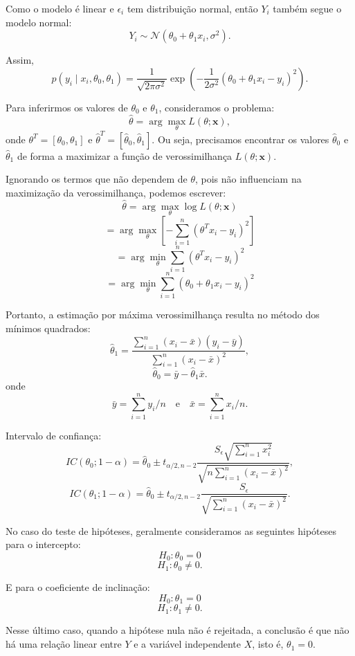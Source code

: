 \documentclass{article}
\begin{document}
Como o modelo é linear e $\epsilon_i$ tem distribuição normal, então $Y_i$ também segue o modelo normal:
    $$
    Y_i \sim \mathcal{N}(\theta_0 + \theta_1 x_i, \sigma^2).
    $$

Assim,
    $$
    p(y_i \mid x_i, \theta_0, \theta_1) = \frac{1}{\sqrt{2 \pi \sigma^2}} 
    \exp\left(-\frac{1}{2\sigma^2}(\theta_0 + \theta_1 x_i - y_i)^2\right).
    $$

Para inferirmos os valores de $\theta_0$ e $\theta_1$, consideramos o problema:
    $$
    \hat{\theta} = \arg\max_\theta L(\theta; \mathbf{x}),
    $$
onde $\theta^T = [\theta_0, \theta_1]$ e $\hat{\theta}^T = [\hat{\theta}_0, \hat{\theta}_1]$. Ou seja, precisamos encontrar os valores $\hat{\theta}_0$ e $\hat{\theta}_1$ de forma a maximizar a função de verossimilhança $L(\theta; \mathbf{x})$.

Ignorando os termos que não dependem de $\theta$, pois não influenciam na maximização da verossimilhança, podemos escrever:
    $$
    \hat{\theta} = \arg\max_\theta \log L(\theta; \mathbf{x})
    $$
    $$
    = \arg\max_\theta \left[-\sum_{i=1}^n (\theta^T x_i - y_i)^2 \right]
    $$
    $$
    = \arg\min_\theta \sum_{i=1}^n (\theta^T x_i - y_i)^2
    $$
    $$
    = \arg\min_\theta \sum_{i=1}^n (\theta_0 + \theta_1 x_i - y_i)^2
    $$

Portanto, a estimação por máxima verossimilhança resulta no método dos mínimos quadrados:
    $$
    \hat{\theta}_1 = \frac{\sum_{i=1}^n (x_i - \bar{x})(y_i - \bar{y})}{\sum_{i=1}^n (x_i - \bar{x})^2},
    $$
    $$
    \hat{\theta}_0 = \bar{y} - \hat{\theta}_1 \bar{x}.
    $$
onde 
    $$
    \bar{y} = \sum_{i=1}^n y_i / n 
    \quad \text{e} \quad 
    \bar{x} = \sum_{i=1}^n x_i / n.
    $$

Intervalo de confiança:
    $$
    IC(\theta_0; 1 - \alpha) = \hat{\theta}_0 \pm t_{\alpha/2, n-2} 
    \frac{S_\epsilon \sqrt{\sum_{i=1}^n x_i^2}}{\sqrt{n \sum_{i=1}^n (x_i - \bar{x})^2}},
    $$
    $$
    IC(\theta_1; 1 - \alpha) = \hat{\theta}_0 \pm t_{\alpha/2, n-2} 
    \frac{S_\epsilon}{\sqrt{\sum_{i=1}^n (x_i - \bar{x})^2}}.
    $$

No caso do teste de hipóteses, geralmente consideramos as seguintes hipóteses para o intercepto:
    $$
    H_0 : \theta_0 = 0
    $$
    $$
    H_1 : \theta_0 \neq 0.
    $$

E para o coeficiente de inclinação:
    $$
    H_0 : \theta_1 = 0
    $$
    $$
    H_1 : \theta_1 \neq 0.
    $$

Nesse último caso, quando a hipótese nula não é rejeitada, a conclusão é que não há uma relação linear entre $Y$ e a variável independente $X$, isto é, $\theta_1 = 0$.
\end{document}
